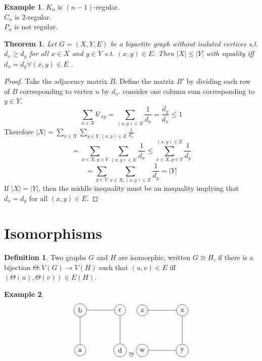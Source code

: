 \documentclass{article}
\newtheorem*{thm}{Theorem}
\theoremstyle{definition}
\newtheorem*{defn}{Definition}
\newtheorem*{ex}{Example}
\begin{document}
\begin{ex}
$K_n$ is $(n-1)$-regular. \\
$C_n$ is $2$-regular. \\
$P_n$ is not regular. \\
\end{ex}


\begin{thm}
Let $G=(X,Y,E)$ be a bipartite graph without isolated vertices s.t. $d_x\geq d_y$ for all $x\in X$ and $y\in Y$ s.t. $(x,y)\in E$.
Then $|X| \leq |Y|$ with equality iff $d_x = d_y \forall (x,y)\in E$ .
\end{thm}
\begin{proof}
Take the adjacency matrix $B$.
Define the matrix $B'$ by dividing each row of $B$ corresponding to vertex $u$ by $d_u$.
consider one column sum corresponding to $y\in Y$.
$$\sum_{x\in X} b'_{xy} = \sum_{(x,y)\in E} \frac{1}{d_x} = \frac{d_y}{d_x} \leq 1$$
Therefore $|X|=\sum_{x\in X}\sum_{y\in Y,(x,y)\in E} \frac{1}{d_x}$
$$=\sum_{x\in X, y\in Y}\sum_{(x,y)\in E} \frac{1}{d_x} \leq \sum_{x\in X, y\in Y}^{(x,y)\in E} \frac{1}{d_y}$$
$$=\sum_{y\in Y} \sum_{x\in X,(x,y)\in E} \frac{1}{d_y} = |Y|$$
If $|X|=|Y|$, then the middle inequality must be an inequality implying that $d_x=d_y$ for all $(x,y)\in E$.
\end{proof}

\section{Isomorphisms}

\begin{defn}
Two graphs $G$ and $H$ are isomorphic, written $G\cong H$, if there is a bijection $\Theta\colon V(G) \to V(H)$ such that $(u,v)\in E$ iff $(\Theta(u),\Theta(v))\in E(H)$.
\end{defn}

\begin{ex}
$$
\begin{tikzpicture}
  \node[draw,circle] (G-1) at (0,0) {a};
  \node[draw,circle] (G-2) at (0,2) {b};
  \node[draw,circle] (G-3) at (2,2) {c};
  \node[draw,circle] (G-4) at (2,0) {d};
  \draw (G-1) -- (G-2) -- (G-3) -- (G-4);
\end{tikzpicture}\cong
\begin{tikzpicture}
  \node[draw,circle] (G-1) at (0,0) {w};
  \node[draw,circle] (G-2) at (0,2) {z};
  \node[draw,circle] (G-3) at (2,2) {x};
  \node[draw,circle] (G-4) at (2,0) {y};
  \draw (G-1) -- (G-4) -- (G-3) -- (G-2);
\end{tikzpicture}$$
\end{ex}
\end{document}
